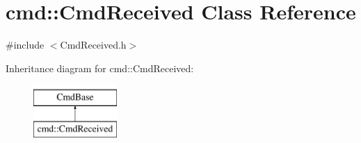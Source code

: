 \hypertarget{classcmd_1_1_cmd_received}{\section{cmd\+:\+:Cmd\+Received Class Reference}
\label{classcmd_1_1_cmd_received}
}


{\ttfamily \#include $<$Cmd\+Received.\+h$>$}

Inheritance diagram for cmd\+:\+:Cmd\+Received\+:\begin{figure}[H]
\begin{center}
\leavevmode
\includegraphics[height=2.000000cm]{classcmd_1_1_cmd_received}
\end{center}
\end{figure}
